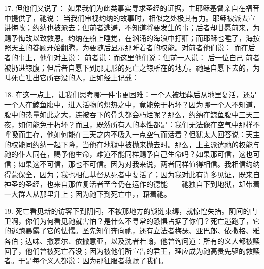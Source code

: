 17. 但他们又说了： 如果我们为此类事实寻求圣经的证据，主耶稣基督亲自在福音中提供了，祂说： 当我们审视约纳的故事时，相似之处极其有力。耶稣被派去宣讲悔改；约纳也被派去；但前者逃避，不知道将要发生的事；后者却甘愿前来，为赐予悔改以致救恩。约纳在船上睡觉，在汹涌的海浪中打鼾；而耶稣也睡了，海按照天主的眷顾开始翻腾，为要随后显示那睡着者的权能。对前者他们说： 而在后者的事上，他们对主说： 前者说：而这里他们说：但前一人说： 后一位自己 前者被扔进鲸腹；但后者自愿下到那无形的死亡之鲸所在的地方。祂是自愿下去的，为叫死亡吐出它所吞没的人，正如经上记载：\par

18. 在这一点上，让我们思考哪一件事更困难：一个人被埋葬后从地里复活，还是一个人在鲸鱼腹中，进入活物的炽热之中，竟能免于朽坏？因为哪一个人不知道，腹中的热量如此之大，连被吞下的骨头都会朽烂呢？那么，约纳在鲸鱼腹中三天三夜，如何能免于朽坏？而且，既然所有人的本性都是：我们无法像在空气中那样不呼吸而生存，他如何能在三天之内不吸入一点空气而活着？但犹太人回答说：天主的权能同约纳一起下降，当他在地狱中被抛来抛去时。那么，上主派遣祂的权能与祂的仆人同在，赐予他生命，难道不能同样赐予自己生命吗？如果那可信，这也可信；如果这不可信，那也不可信。因为对我来说，两者同样值得相信。我相信约纳得蒙保全，因为；我也相信基督从死者中复活了；因为我对此有许多见证，既来自神圣的圣经，也来自那位复活者至今仍在运作的德能——祂独自下到地狱，却带着一大群人从那里升上；因为祂下到死亡中，，藉着祂。\par

19. 死亡看见新的访客下到阴间，不被那地方的锁链束缚，就惊惶失措。阴间的门卫啊，你们为何看见祂就害怕？是什么不寻常的恐惧占据了你们？死亡逃跑了，它的逃跑暴露了它的怯懦。圣先知们奔向祂，还有立法者梅瑟、亚巴郎、依撒格、雅各伯；达味、撒慕尔、依撒意亚，以及洗者若翰，他曾询问道：所有的义人都被赎回了，他们曾被死亡吞没；因为被他们所宣告的君王，理应成为祂高贵先驱的救赎者。于是每个义人都说：因为那征服者救赎了我们。\par

